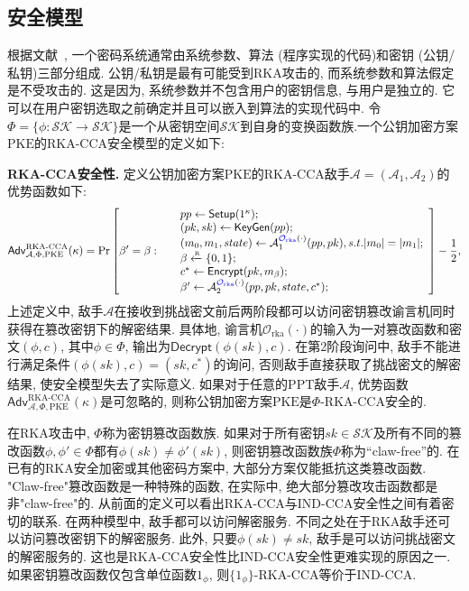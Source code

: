 \subsection{安全模型}
根据文献~\cite{BCM-ASIACRYPT-2011}, 一个密码系统通常由系统参数、算法 (程序实现的代码)和密钥 (公钥/私钥)三部分组成. 公钥/私钥是最有可能受到RKA攻击的, 而系统参数和算法假定是不受攻击的. 这是因为, 系统参数并不包含用户的密钥信息, 与用户是独立的. 它可以在用户密钥选取之前确定并且可以嵌入到算法的实现代码中. 令$\Phi = \{\phi: \mathcal{SK} \rightarrow \mathcal{SK}\}$是一个从密钥空间$\mathcal{SK}$到自身的变换函数族.一个公钥加密方案$\text{PKE}$的RKA-CCA安全模型的定义如下:
\begin{trivlist}
\item \textbf{RKA-CCA安全性.} 定义公钥加密方案$\text{PKE}$的RKA-CCA敌手$\mathcal{A} = (\mathcal{A}_1, \mathcal{A}_2)$的优势函数如下: 
\begin{displaymath}
	\mathsf{Adv}_{\mathcal{A}, \Phi, \text{PKE}}^{\text{RKA-CCA}}(\kappa) = \Pr \left[ \beta' = \beta:~
	\begin{array}{ll}
		& pp \leftarrow \mathsf{Setup}(1^\kappa); \\		
		& (pk, sk) \leftarrow \mathsf{KeyGen}(pp);\\
		& (m_0, m_1, state) \leftarrow \mathcal{A}_1^{{\color{blue} \mathcal{O}_{\text{rka}}}(\cdot)}(pp, pk), s.t. |m_0| = |m_1|; \\
		& \beta \xleftarrow{\textup{\tiny R}} \{0,1\};\\ 
        & c^* \leftarrow \mathsf{Encrypt}(pk, m_\beta);\\
        & \beta' \leftarrow \mathcal{A}_2^{{\color{blue} \mathcal{O}_{\text{rka}}}(\cdot)}(pp, pk, state, c^*);
	\end{array} 
\right] - \frac{1}{2},
\end{displaymath}
上述定义中, 敌手$\mathcal{A}$在接收到挑战密文前后两阶段都可以访问密钥篡改谕言机同时获得在篡改密钥下的解密结果. 具体地, 谕言机$\mathcal{O}_{\text{rka}}(\cdot)$的输入为一对篡改函数和密文$(\phi, c)$, 其中$\phi \in \Phi$, 输出为$\mathsf{Decrypt}(\phi(sk), c)$. 在第2阶段询问中, 敌手不能进行满足条件$(\phi(sk), c) = (sk, c^*)$的询问, 否则敌手直接获取了挑战密文的解密结果, 使安全模型失去了实际意义. 如果对于任意的PPT敌手$\mathcal{A}$, 优势函数$\mathsf{Adv}_{\mathcal{A}, \Phi, \text{PKE}}^{\text{RKA-CCA}}(\kappa)$是可忽略的, 则称公钥加密方案$\text{PKE}$是$\Phi$-RKA-CCA安全的.
\end{trivlist}

\begin{note}
在RKA攻击中, $\Phi$称为密钥篡改函数族. 如果对于所有密钥$sk\in\mathcal{SK}$及所有不同的篡改函数$\phi,\phi' \in \Phi$都有$\phi(sk) \neq \phi'(sk)$, 则密钥篡改函数族$\Phi$称为``claw-free''的. 在已有的RKA安全加密或其他密码方案中, 大部分方案仅能抵抗这类篡改函数. "Claw-free"篡改函数是一种特殊的函数, 在实际中, 绝大部分篡改攻击函数都是非"claw-free"的. 从前面的定义可以看出RKA-CCA与IND-CCA安全性之间有着密切的联系. 在两种模型中, 敌手都可以访问解密服务. 不同之处在于RKA敌手还可以访问篡改密钥下的解密服务. 此外, 只要$\phi(sk) \neq sk$, 敌手是可以访问挑战密文的解密服务的. 这也是RKA-CCA安全性比IND-CCA安全性更难实现的原因之一. 如果密钥篡改函数仅包含单位函数$1_\phi$, 则$\{1_\phi\}$-RKA-CCA等价于IND-CCA.
\end{note}

